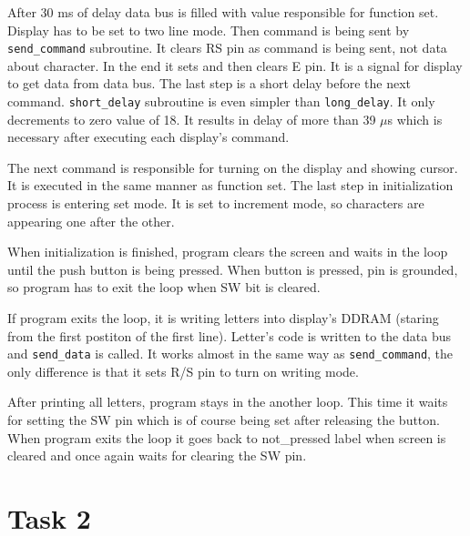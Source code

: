 \documentclass{article}
\begin{document}
After 30 ms of delay data bus is filled with value responsible for function set. 
Display has to be set to two line mode. Then command is being sent by \texttt{send\_command}
subroutine. It clears RS pin as command is being sent, not data about character. In the end
it sets and then clears E pin. It is a signal for display to get data from data bus. The last
step is a short delay before the next command. \texttt{short\_delay} subroutine
is even simpler than \texttt{long\_delay}. It only decrements to zero value of 18.
It results in delay of more than 39 $\mu$s which is necessary after executing each display's command.

The next command is responsible for turning on the display and showing cursor. It is executed
in the same manner as function set. The last step in initialization process is entering
set mode. It is set to increment mode, so characters are appearing one after the other.

When initialization is finished, program clears the screen and waits in the loop until
the push button is being pressed. When button is pressed, pin is grounded, so program has to
exit the loop when SW bit is cleared.

If program exits the loop, it is writing letters into display's DDRAM (staring from the first postiton of the first line).
Letter's code is written to the data bus and \texttt{send\_data} is called.
It works almost in the same way as \texttt{send\_command}, the only difference is that
it sets R/S pin to turn on writing mode.

After printing all letters, program stays in the another loop. This time it waits for setting
the SW pin which is of course being set after releasing the button. When program exits the loop
it goes back to not\_pressed label when screen is cleared and once again waits for clearing the SW pin.

\section{Task 2}
\end{document}
